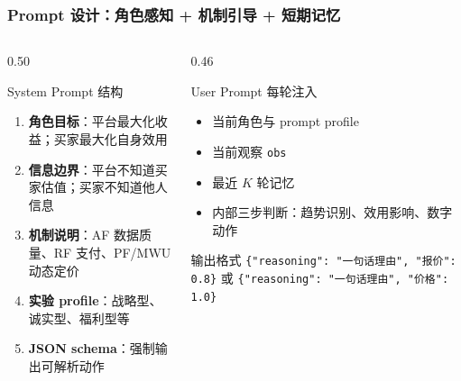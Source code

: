 \documentclass[10pt,aspectratio=169]{beamer}
\begin{document}
\begin{frame}
	\frametitle{Prompt 设计：角色感知 + 机制引导 + 短期记忆}

	\begin{columns}[T]
		\begin{column}{0.50\textwidth}
			\begin{block}{System Prompt 结构}
				\small
				\begin{enumerate}
					\item \textbf{角色目标}：平台最大化收益；买家最大化自身效用
					\item \textbf{信息边界}：平台不知道买家估值；买家不知道他人信息
					\item \textbf{机制说明}：AF 数据质量、RF 支付、PF/MWU 动态定价
					\item \textbf{实验 profile}：战略型、诚实型、福利型等
					\item \textbf{JSON schema}：强制输出可解析动作
				\end{enumerate}
			\end{block}
		\end{column}
		\begin{column}{0.46\textwidth}
			\begin{block}{User Prompt 每轮注入}
				\small
				\begin{itemize}
					\item 当前角色与 prompt profile
					\item 当前观察 \texttt{obs}
					\item 最近 $K$ 轮记忆
					\item 内部三步判断：趋势识别、效用影响、数字动作
				\end{itemize}
			\end{block}
			\begin{alertblock}{输出格式}
				\small \texttt{\{"reasoning": "一句话理由", "报价": 0.8\}} 或 \texttt{\{"reasoning": "一句话理由", "价格": 1.0\}}
			\end{alertblock}
		\end{column}
	\end{columns}
\end{frame}
\end{document}

